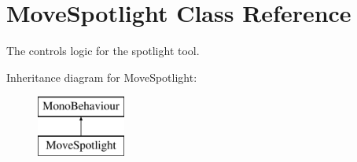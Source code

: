 \section{Move\+Spotlight Class Reference}
\label{class_move_spotlight}


The controls logic for the spotlight tool.  


Inheritance diagram for Move\+Spotlight\+:\begin{figure}[H]
\begin{center}
\leavevmode
\includegraphics[height=2.000000cm]{class_move_spotlight}
\end{center}
\end{figure}
